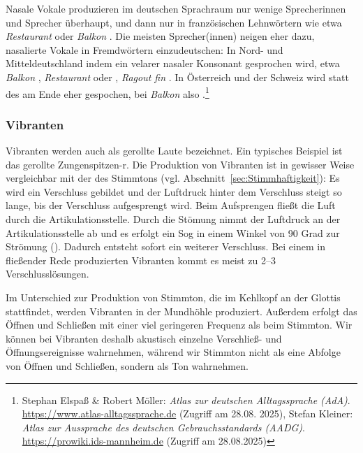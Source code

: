 Nasale Vokale produzieren im deutschen Sprachraum nur wenige Sprecherinnen und Sprecher überhaupt, und dann nur in französischen Lehnwörtern wie etwa \textit{Restaurant}  oder \textit{Balkon} . Die meisten Sprecher(innen) neigen eher dazu, nasalierte Vokale in Fremdwörtern einzudeutschen: In Nord- und Mitteldeutschland \zB indem ein velarer nasaler Konsonant gesprochen wird, etwa \textit{Balkon} , \textit{Restaurant}  oder , \textit{Ragout fin}  \citep[35, 69]{DudenAussprache2023}. In Österreich und der Schweiz wird statt des \textipa{[N]} am Ende eher \textipa{[n]} gespochen, bei \textit{Balkon}  also .\footnote{Stephan Elspaß \& Robert Möller: \textit{Atlas zur deutschen Alltagssprache (AdA)}. \url{https://www.atlas-alltagssprache.de} (Zugriff am 28.08. 2025), Stefan Kleiner: \textit{Atlas zur Aussprache des deutschen Gebrauchsstandards (AADG)}. \url{https://prowiki.ids-mannheim.de} (Zugriff am 28.08.2025)}


\subsubsection{Vibranten}
\label{sec:Vibranten}
 Vibranten werden auch als gerollte Laute bezeichnet. Ein typisches Beispiel ist das gerollte Zungenspitzen-r. Die Produktion von Vibranten ist in gewisser Weise vergleichbar mit der des Stimmtons (vgl. Abschnitt~\ref{sec:Stimmhaftigkeit}): Es wird ein Verschluss gebildet und der Luftdruck hinter dem Verschluss steigt so lange, bis der Verschluss aufgesprengt wird. Beim Aufsprengen fließt die Luft durch die Artikulationsstelle. Durch die Stömung nimmt der Luftdruck an der Artikulationsstelle ab und es erfolgt ein Sog in einem Winkel von 90 Grad zur Strömung (). Dadurch  entsteht sofort ein weiterer Verschluss. Bei einem in fließender Rede produzierten Vibranten kommt es meist zu 2--3 Verschlusslösungen.

Im Unterschied zur Produktion von Stimmton, die im Kehlkopf an der Glottis stattfindet, werden Vibranten in der Mundhöhle produziert. Außerdem erfolgt das Öffnen und Schließen mit einer viel geringeren Frequenz als beim Stimmton. Wir können bei Vibranten deshalb akustisch einzelne Verschließ- und Öffnungsereignisse wahrnehmen, während wir Stimmton nicht als eine Abfolge von Öffnen und Schließen, sondern als Ton wahrnehmen.

